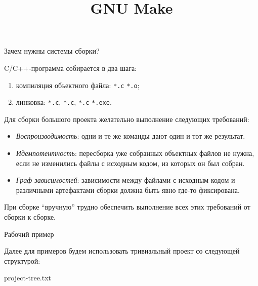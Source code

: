 \documentclass[compress, 8pt, aspectratio=169]{beamer}
\title{GNU Make}
\begin{document}
\begin{frame}
  \titlepage
\end{frame}

\begin{frame}{Зачем нужны системы сборки?}

  C/C++-программа собирается в два шага:

  \begin{enumerate}

    \item компиляция объектного файла: \texttt{*.c} \textrightarrow \space \texttt{*.o};

    \item линковка: \texttt{*.c}, \texttt{*.c}, \texttt{*.c} \textrightarrow \space \texttt{*.exe}.

  \end{enumerate}

  \bigbreak

  Для сборки большого проекта желательно выполнение следующих требований:

  \begin{itemize}

    \item \textit{Воспроизводимость}: одни и те же команды дают один и тот же результат.

    \item \textit{Идемпотентность}: пересборка уже собранных объектных файлов не нужна,
      если не изменились файлы с исходным кодом, из которых он был собран.

    \item \textit{Граф зависимостей}: зависимости между файлами с исходным кодом и
      различными артефактами сборки должна быть явно где-то фиксирована.

  \end{itemize}

  При сборке \enquote{вручную} трудно обеспечить выполнение всех этих требований
  от сборки к сборке.

\end{frame}

\begin{frame}[fragile]{Рабочий пример}

  Далее для примеров будем использовать тривиальный проект со следующей
  структурой:

  \bigbreak

    {project-tree.txt}
\end{frame}
\end{document}
